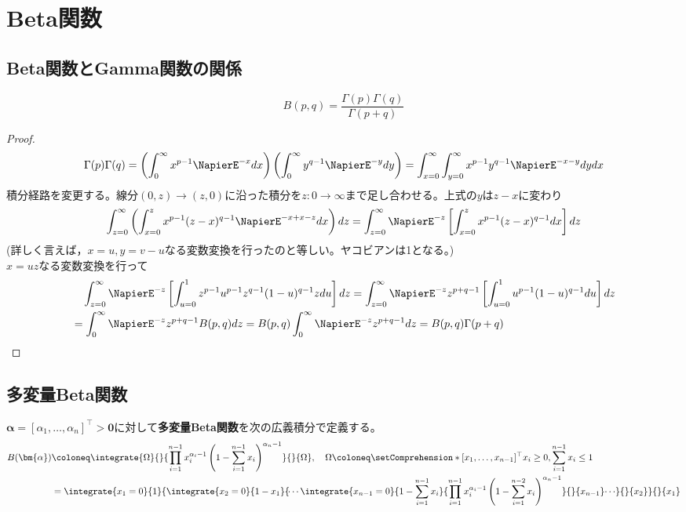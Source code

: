 \chapter{Beta関数}
    \section{Beta関数とGamma関数の関係}
        \begin{shadebox}
            \[B(p,q) = \frac{\Gamma(p)\Gamma(q)}{\Gamma(p+q)}\]
        \end{shadebox}
        \begin{proof}
            \[\Gamma(p)\Gamma(q) = \left(\int_{0}^{\infty}{x^{p-1}\NapierE^{-x} dx}\right)\left(\int_{0}^{\infty}{y^{q-1}\NapierE^{-y} dy}\right) = \int_{x=0}^{\infty}{\int_{y=0}^{\infty}{x^{p-1}y^{q-1}\NapierE^{-x-y} dy} dx}\]
            積分経路を変更する。線分$(0,z)\to(z,0)$に沿った積分を$z:0 \to \infty$まで足し合わせる。上式の$y$は$z-x$に変わり
            \[\int_{z=0}^{\infty}{\left(\int_{x=0}^{z}{x^{p-1}(z-x)^{q-1}\NapierE^{-x+x-z} dx}\right) dz} = \int_{z=0}^{\infty}{\NapierE^{-z}\left[\int_{x=0}^{z}{x^{p-1}(z-x)^{q-1} dx}\right] dz}\]
            (詳しく言えば，$x=u,y=v-u$なる変数変換を行ったのと等しい。ヤコビアンは1となる。)
            \\$x=uz$なる変数変換を行って
            \begin{align*}
                &\quad\int_{z=0}^{\infty}{\NapierE^{-z}\left[\int_{u=0}^{1}{z^{p-1}u^{p-1}z^{q-1}(1-u)^{q-1} zdu}\right] dz} = \int_{z=0}^{\infty}{\NapierE^{-z}z^{p+q-1}\left[\int_{u=0}^{1}{u^{p-1}(1-u)^{q-1} du}\right] dz}\\
                &= \int_{0}^{\infty}{\NapierE^{-z}z^{p+q-1}B(p,q) dz} = B(p,q)\int_{0}^{\infty}{\NapierE^{-z}z^{p+q-1} dz} = B(p,q)\Gamma(p+q)
            \end{align*}
        \end{proof}
    \section{多変量Beta関数}
        \begin{shadebox}
            $ \bm{\alpha} = [\alpha_1,\dotsc,\alpha_n]^\top > \bm{0}$に対して\textbf{多変量Beta関数}を次の広義積分で定義する。
            \begin{align*}
                B(\bm{\alpha}) &\coloneq \integrate{\Omega}{}{\prod_{i=1}^{n-1} x_i^{\alpha_i-1} \left(1-\sum_{i=1}^{n-1} x_i\right)^{\alpha_n-1}}{}{\Omega}, \quad \Omega \coloneq \setComprehension*{[x_1,\dotsc,x_{n-1}]^\top}{x_i\geq 0, \sum_{i=1}^{n-1} x_i\leq 1} \\
                &= \integrate{x_1=0}{1}{\integrate{x_2=0}{1-x_1}{\dotsi\integrate{x_{n-1}=0}{1-\sum_{i=1}^{n-1} x_i}{\prod_{i=1}^{n-1} x_i^{\alpha_i-1}\left(1-\sum_{i=1}^{n-2} x_i\right)^{\alpha_n-1}}{}{x_{n-1}}\dotsi}{}{x_2}}{}{x_1}
            \end{align*}
        \end{shadebox}
